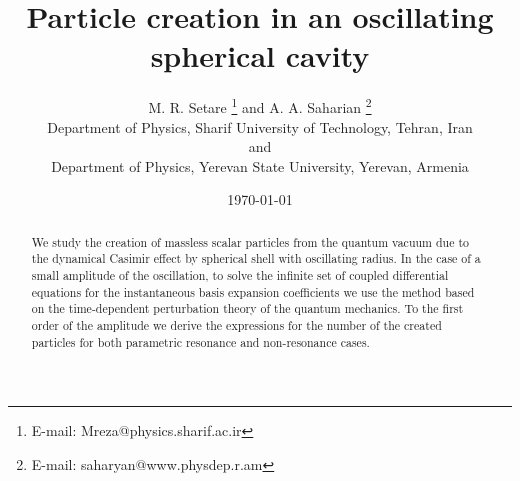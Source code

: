 \documentclass[a4paper,11pt]{article}
\begin{document}
\title{\bf {Particle creation in an oscillating spherical cavity }}
\author{
M. R. Setare \coordHE{} \footnote{E-mail: Mreza@physics.sharif.ac.ir}
 and A. A. Saharian  \coordHE{}\footnote{E-mail: saharyan@www.physdep.r.am }  \\
 {\coordHE{} Department of Physics, Sharif University of
Technology, Tehran, Iran}\\ and \\
{\coordHE{}}Department of Physics, Yerevan State University, Yerevan,
Armenia }
\date{\small{\today}}
 \maketitle
\begin{abstract}
We study the creation of massless scalar particles from the
quantum vacuum due to the dynamical Casimir effect by spherical
shell with oscillating radius. In the case of a small amplitude of
the oscillation, to solve the infinite set of coupled differential
equations for the instantaneous basis expansion coefficients we
use the method based on the time-dependent perturbation theory of
the quantum mechanics. To the first order of the amplitude we
derive the expressions for the number of the created particles for
both parametric resonance and non-resonance cases.
 \end{abstract}

\newpage
\end{document}
